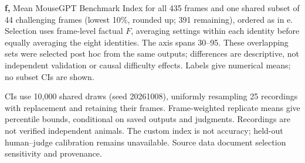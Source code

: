 {\textbf{f,} Mean MouseGPT Benchmark Index for all 435 frames and one shared subset of 44 challenging frames (lowest 10\%, rounded up; 391 remaining), ordered as in e. Selection uses frame-level factual \(F\), averaging settings within each identity before equally averaging the eight identities. The axis spans 30--95. These overlapping sets were selected post hoc from the same outputs; differences are descriptive, not independent validation or causal difficulty effects. Labels give numerical means; no subset CIs are shown.

CIs use 10,000 shared draws (seed 20261008), uniformly resampling 25 recordings with replacement and retaining their frames. Frame-weighted replicate means give percentile bounds, conditional on saved outputs and judgments. Recordings are not verified independent animals. The custom index is not accuracy; held-out human--judge calibration remains unavailable. Source data document selection sensitivity and provenance.}
